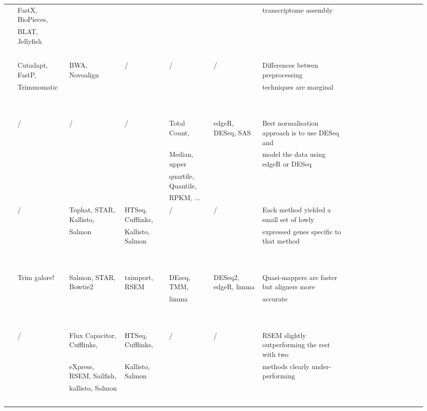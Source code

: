 \begin{landscape}
\begin{table}[h]
\begin{adjustwidth}{-1cm}{}
\begin{tabular}{llllllllllllllllll}
        ~ & FastX, BioPieces,  & ~ & ~ & ~ & ~ & transcriptome assembly  \\ 
        ~ & BLAT, Jellyfish & ~ & ~ & ~ & ~ &   \\ 
        ~ & ~ & ~ & ~ & ~ & ~ &   \\ \hline
       \cite{he2020assessing} & Cutadapt, FastP,  & BWA, Novoalign & / & / & / & Differences betwen preprocessing  \\ 
        ~ & Trimmomatic & ~ & ~ & ~ & ~ & techniques are marginal   \\ 
        ~ & ~ & ~ & ~ & ~ & ~ &   \\ 
        ~ & ~ & ~ & ~ & ~ & ~ &   \\ \hline
        \cite{lin2016comparison} & / & / & / & Total Count, & edgeR, DESeq, SAS & Best normalisation approach is to use DESeq and   \\ 
        ~ & ~ & ~ & ~ &  Median, upper  & ~ & model the data using edgeR or DESeq  \\ 
        ~ & ~ & ~ & ~ & quartile, Quantile,  & ~ &   \\ 
        ~ & ~ & ~ & ~ & RPKM, ... & ~ &   \\ \hline
        \cite{everaert2017benchmarking} & / & Tophat, STAR, Kallisto,  & HTSeq, Cufflinks,  & / & / & Each method yielded a small set of lowly  \\ 
        ~ & ~ & Salmon & Kallisto, Salmon & ~ & ~ &  expressed genes  specific to that method  \\ 
        ~ & ~ & ~ & ~ & ~ & ~ &   \\ 
        ~ & ~ & ~ & ~ & ~ & ~ &   \\ \hline
        \cite{srivastava2020alignment} & Trim galore!  & Salmon, STAR, Bowtie2 & tximport, RSEM & DEseq, TMM,  & DESeq2, edgeR, limma & Quasi-mappers are faster but aligners more   \\ 
        ~ & ~ & ~ & ~ & limma & ~ & accurate  \\ 
        ~ & ~ & ~ & ~ & ~ & ~ &   \\ 
        ~ & ~ & ~ & ~ & ~ & ~ &   \\ \hline
        \cite{teng2016benchmark} & / & Flux Capacitor, Cufflinks, & HTSeq, Cufflinks, & / & / & RSEM slightly outperforming the rest with two     \\ 
        ~ & ~ &  eXpress, RSEM, Sailfish, &  Kallisto, Salmon & ~ & ~ & methods clearly under-performing  \\ 
        ~ & ~ &  kallisto, Salmon  & ~ & ~ & ~ &   \\ 
        ~ & ~ & ~ & ~ & ~ & ~ &   \\ \bottomrule
    \end{tabular}
    \end{adjustwidth}
\end{table}
\end{landscape}



